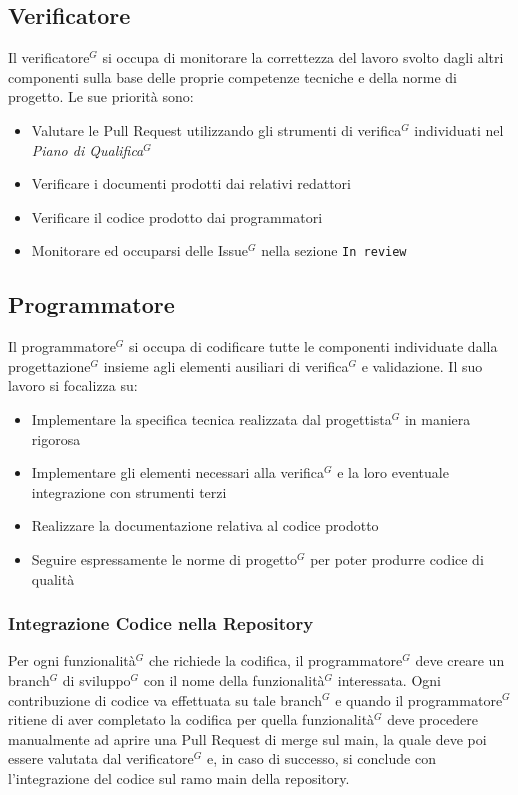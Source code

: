 \documentclass[a4paper,10pt]{article}
\begin{document}
\subsection{Verificatore}
Il verificatore$^G$ si occupa di monitorare la correttezza del lavoro svolto dagli altri componenti sulla base delle
proprie competenze tecniche e della norme di progetto.
Le sue priorità sono:
\begin{itemize}
\item Valutare le Pull Request utilizzando gli strumenti di verifica$^G$ individuati nel \textit{Piano di Qualifica$^G$} 
\item Verificare i documenti prodotti dai relativi redattori
\item Verificare il codice prodotto dai programmatori
\item Monitorare ed occuparsi delle Issue$^G$ nella sezione \texttt{In review} 
\end{itemize}

\subsection{Programmatore}
Il programmatore$^G$ si occupa di codificare tutte le componenti individuate dalla progettazione$^G$ insieme agli elementi
ausiliari di verifica$^G$ e validazione. Il suo lavoro si focalizza su:
\begin{itemize}
  \item Implementare la specifica tecnica realizzata dal progettista$^G$ in maniera rigorosa
  \item Implementare gli elementi necessari alla verifica$^G$ e la loro eventuale integrazione con strumenti terzi
  \item Realizzare la documentazione relativa al codice prodotto
  \item Seguire espressamente le norme di progetto$^G$ per poter produrre codice di qualità
\end{itemize}
\subsubsection{Integrazione Codice nella Repository}
Per ogni funzionalità$^G$ che richiede la codifica, il programmatore$^G$ deve creare un branch$^G$ di sviluppo$^G$ con il nome
della funzionalità$^G$ interessata. Ogni contribuzione di codice va effettuata su tale branch$^G$ e quando il programmatore$^G$
ritiene di aver completato la codifica per quella funzionalità$^G$ deve procedere manualmente ad aprire una Pull Request
di merge sul main, la quale deve poi essere valutata dal verificatore$^G$ e, in caso di successo, si conclude con  
l'integrazione del codice sul ramo main della repository.
\end{document}
